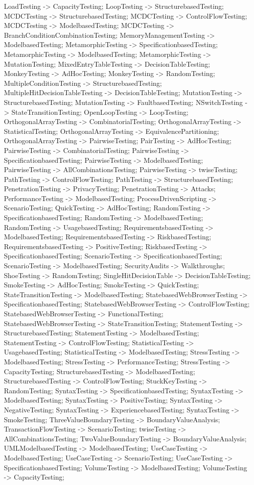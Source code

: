 \documentclass{article}
\begin{document}
{LoadTesting -> CapacityTesting;
LoopTesting -> StructurebasedTesting;
MCDCTesting -> StructurebasedTesting;
MCDCTesting -> ControlFlowTesting;
MCDCTesting -> ModelbasedTesting;
MCDCTesting -> BranchConditionCombinationTesting;
MemoryManagementTesting -> ModelbasedTesting;
MetamorphicTesting -> SpecificationbasedTesting;
MetamorphicTesting -> ModelbasedTesting;
MetamorphicTesting -> MutationTesting;
MixedEntryTableTesting -> DecisionTableTesting;
MonkeyTesting -> AdHocTesting;
MonkeyTesting -> RandomTesting;
MultipleConditionTesting -> StructurebasedTesting;
MultipleHitDecisionTableTesting -> DecisionTableTesting;
MutationTesting -> StructurebasedTesting;
MutationTesting -> FaultbasedTesting;
NSwitchTesting -> StateTransitionTesting;
OpenLoopTesting -> LoopTesting;
OrthogonalArrayTesting -> CombinatorialTesting;
OrthogonalArrayTesting -> StatisticalTesting;
OrthogonalArrayTesting -> EquivalencePartitioning;
OrthogonalArrayTesting -> PairwiseTesting;
PairTesting -> AdHocTesting;
PairwiseTesting -> CombinatorialTesting;
PairwiseTesting -> SpecificationbasedTesting;
PairwiseTesting -> ModelbasedTesting;
PairwiseTesting -> AllCombinationsTesting;
PairwiseTesting -> twiseTesting;
PathTesting -> ControlFlowTesting;
PathTesting -> StructurebasedTesting;
PenetrationTesting -> PrivacyTesting;
PenetrationTesting -> Attacks;
PerformanceTesting -> ModelbasedTesting;
ProcessDrivenScripting -> ScenarioTesting;
QuickTesting -> AdHocTesting;
RandomTesting -> SpecificationbasedTesting;
RandomTesting -> ModelbasedTesting;
RandomTesting -> UsagebasedTesting;
RequirementsbasedTesting -> ModelbasedTesting;
RequirementsbasedTesting -> RiskbasedTesting;
RequirementsbasedTesting -> PositiveTesting;
RiskbasedTesting -> SpecificationbasedTesting;
ScenarioTesting -> SpecificationbasedTesting;
ScenarioTesting -> ModelbasedTesting;
SecurityAudits -> Walkthroughs;
ShoeTesting -> RandomTesting;
SingleHitDecisionTable -> DecisionTableTesting;
SmokeTesting -> AdHocTesting;
SmokeTesting -> QuickTesting;
StateTransitionTesting -> ModelbasedTesting;
StatebasedWebBrowserTesting -> SpecificationbasedTesting;
StatebasedWebBrowserTesting -> ControlFlowTesting;
StatebasedWebBrowserTesting -> FunctionalTesting;
StatebasedWebBrowserTesting -> StateTransitionTesting;
StatementTesting -> StructurebasedTesting;
StatementTesting -> ModelbasedTesting;
StatementTesting -> ControlFlowTesting;
StatisticalTesting -> UsagebasedTesting;
StatisticalTesting -> ModelbasedTesting;
StressTesting -> ModelbasedTesting;
StressTesting -> PerformanceTesting;
StressTesting -> CapacityTesting;
StructurebasedTesting -> ModelbasedTesting;
StructurebasedTesting -> ControlFlowTesting;
StuckKeyTesting -> RandomTesting;
SyntaxTesting -> SpecificationbasedTesting;
SyntaxTesting -> ModelbasedTesting;
SyntaxTesting -> PositiveTesting;
SyntaxTesting -> NegativeTesting;
SyntaxTesting -> ExperiencebasedTesting;
SyntaxTesting -> SmokeTesting;
ThreeValueBoundaryTesting -> BoundaryValueAnalysis;
TransactionFlowTesting -> ScenarioTesting;
twiseTesting -> AllCombinationsTesting;
TwoValueBoundaryTesting -> BoundaryValueAnalysis;
UMLModelbasedTesting -> ModelbasedTesting;
UseCaseTesting -> ModelbasedTesting;
UseCaseTesting -> ScenarioTesting;
UseCaseTesting -> SpecificationbasedTesting;
VolumeTesting -> ModelbasedTesting;
VolumeTesting -> CapacityTesting;

}
\end{document}
